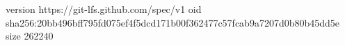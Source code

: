version https://git-lfs.github.com/spec/v1
oid sha256:20bb496bff795fd075ef4f5dcd171b00f362477c57fcab9a7207d0b80b45dd5e
size 262240

